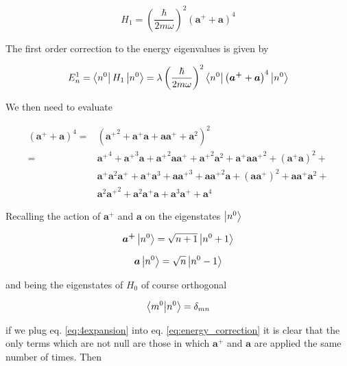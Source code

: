 \documentclass{article}
\begin{document}
\begin{equation}
H_1 = \left( \frac{\hbar}{2m \omega} \right)^2 \left( \bm{a^+} + \bm{a} \right)^4
\end{equation}

The first order correction to the energy eigenvalues is given by

\begin{equation}
\label{eq:energy_correction}
E_n^1 = \bra{n^0} H_1 \ket{n^0} = \lambda \left( \frac{\hbar}{2m \omega} \right)^2 \bra{n^0} \left( \bm{a^+} + \bm{a} \right)^4 \ket{n^0}
\end{equation}

We then need to evaluate

\begin{align}
\label{eq:4expansion}
\left( \bm{a^+} + \bm{a} \right)^4 = & \left( {\bm{a^+}}^2 + \bm{a^+} \bm{a} + \bm{a} \bm{a^+} + \bm{a}^2 \right)^2 \nonumber \\
= & {\bm{a^+}}^4 + {\bm{a^+}}^3 \bm{a} + {\bm{a^+}}^2 \bm{a} \bm{a^+} + {\bm{a^+}}^2 \bm{a}^2 + \bm{a^+} \bm{a} {\bm{a^+}}^2 + (\bm{a^+}\bm{a})^2 + \nonumber \\ 
& \bm{a^+}\bm{a}^2\bm{a^+} + \bm{a^+} \bm{a}^3 + \bm{a} {\bm{a^+}}^3 + \bm{a} {\bm{a^+}}^2 \bm{a} + (\bm{a} \bm{a^+})^2 + \bm{a} \bm{a^+} \bm{a}^2 + \nonumber \\
& \bm{a}^2 {\bm{a^+}}^2 + \bm{a}^2 \bm{a^+} \bm{a} + \bm{a}^3 \bm{a^+} + \bm{a}^4
\end{align}

Recalling the action of \( \bm{a^+} \) and \( \bm{a} \) on the eigenstates \( \ket{n^0} \)

\begin{equation}
\bm{a^+} \ket{n^0} = \sqrt{n + 1} \ket{n^0 + 1}
\end{equation}

\begin{equation}
\bm{a} \ket{n^0} = \sqrt{n} \ket{n^0 - 1}
\end{equation}

and being the eigenstates of \( H_0 \) of course orthogonal

\begin{equation}
\braket{m^0}{n^0} = \delta_{mn}
\end{equation}

if we plug eq. \eqref{eq:4expansion} into eq. \eqref{eq:energy_correction} it is clear that the only terms which are not null are those in which \( \bm{a^+} \) and \(\bm{a} \) are applied the same number of times. Then
\end{document}
